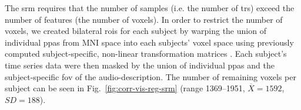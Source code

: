 
The \ac{srm} requires that the number of samples (i.e. the number of \acp{tr})
exceed the number of features (the number of voxels).
%
In order to restrict the number of voxels, we created bilateral \acp{roi} for
each subject by warping the union of individual \acp{ppa}
\citep[s.][]{haeusler2022processing} from MNI space into each subjects' voxel
space using previously computed subject-specific, non-linear transformation
matrices
\citep[][\href{https://github.com/psychoinformatics-de/studyforrest-data-templatetransforms
}{\url{github.com/psychoinformatics-de/studyforrest-data-templatetransforms}}]{hanke2014audiomovie}.
Each subject's time series data were then masked by the union of individual
\acp{ppa} and the subject-specific \ac{fov} of the audio-description.
%
The number of remaining voxels per subject can be seen in
Fig.~\ref{fig:corr-vis-reg-srm} (range 1369--1951, $\overline{X}=1592$,
$SD=188$).




\begin{comment}

The number of remaining voxels per subject can be seen in Table
\ref{tab:ppamaskvoxels} (range 1369--1951, $\overline{X}=1592$, $SD=188$).


\begin{table*}[btp]
    \caption{
    \textbf{Table heading.}
    Number of remaining voxels after time series data of each paradigm
    and subject were masked with the union of individual \acp{ppa} that was
    warped from MNI space into each individual's subjects-space and the
    subject-specific field of view of audio-description.}

\label{tab:ppamaskvoxels}
\begin{tabular}{ll}
    \toprule
    \textbf{Subject} & \textbf{no. of voxels} \\
    \midrule
    sub-01 & 1665 \tabularnewline
    sub-02 & 1732 \tabularnewline
    sub-03 & 1400 \tabularnewline
    sub-04 & 1575 \tabularnewline
    sub-05 & 1664 \tabularnewline
    sub-06 & 1951 \tabularnewline
    sub-14 & 1376 \tabularnewline
    sub-09 & 1383 \tabularnewline
    sub-15 & 1683 \tabularnewline
    sub-16 & 1887 \tabularnewline
    sub-17 & 1441 \tabularnewline
    sub-18 & 1729 \tabularnewline
    sub-19 & 1369 \tabularnewline
    sub-20 & 1437 \tabularnewline
    \bottomrule
\end{tabular}
\caption*{The legend text goes here.}
\end{table*}

\end{comment}



